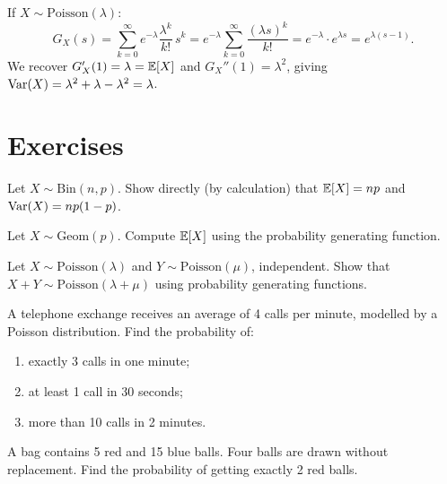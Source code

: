 \begin{example}
If $X \sim \mathrm{Poisson}(\lambda)$:
\[
    G_X(s) = \sum_{k=0}^{\infty} e^{-\lambda}\frac{\lambda^k}{k!}\,s^k
    = e^{-\lambda}\sum_{k=0}^{\infty}\frac{(\lambda s)^k}{k!}
    = e^{-\lambda}\cdot e^{\lambda s} = e^{\lambda(s-1)}.
\]
We recover $G_X'(1) = \lambda = \mathbb{E}[X]$ and $G_X''(1) = \lambda^2$, giving
$\mathrm{Var}(X) = \lambda^2 + \lambda - \lambda^2 = \lambda$.
\end{example}

\section{Exercises}

\begin{exercise}
Let $X \sim \mathrm{Bin}(n,p)$. Show directly (by calculation) that
$\mathbb{E}[X] = np$ and $\mathrm{Var}(X) = np(1-p)$.
\end{exercise}

\begin{exercise}
Let $X \sim \mathrm{Geom}(p)$. Compute $\mathbb{E}[X]$ using the probability
generating function.
\end{exercise}

\begin{exercise}
Let $X \sim \mathrm{Poisson}(\lambda)$ and $Y \sim \mathrm{Poisson}(\mu)$,
independent. Show that $X + Y \sim \mathrm{Poisson}(\lambda + \mu)$ using
probability generating functions.
\end{exercise}

\begin{exercise}
A telephone exchange receives an average of 4 calls per minute, modelled by a
Poisson distribution. Find the probability of:
\begin{enumerate}[label=(\alph*)]
    \item exactly 3 calls in one minute;
    \item at least 1 call in 30 seconds;
    \item more than 10 calls in 2 minutes.
\end{enumerate}
\end{exercise}

\begin{exercise}
A bag contains 5 red and 15 blue balls. Four balls are drawn without replacement.
Find the probability of getting exactly 2 red balls.
\end{exercise}

